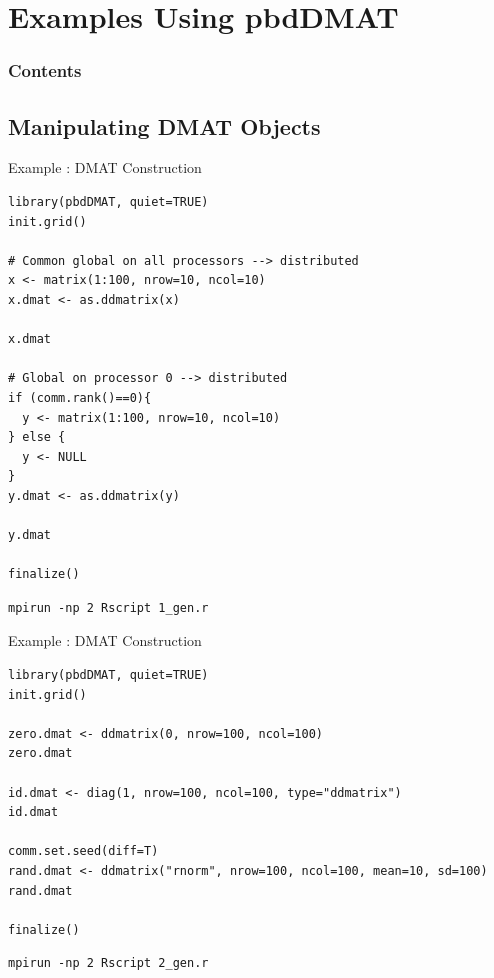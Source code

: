 \section[pbdDMAT eg's]{Examples Using pbdDMAT}
\setcounter{excount}{0}


\hidenum
\begin{frame}[noframenumbering]
\frametitle{Contents}
 \tableofcontents[currentsection,hideothersubsections,sectionstyle=show/hide]
\end{frame}
\shownum



\subsection{Manipulating DMAT Objects}

\begin{frame}
  \begin{exampleblock}{Example \countex:  DMAT Construction}\pause
\begin{lstlisting}[title=Generate a global matrix and distribute it]
library(pbdDMAT, quiet=TRUE)
init.grid()

# Common global on all processors --> distributed
x <- matrix(1:100, nrow=10, ncol=10)
x.dmat <- as.ddmatrix(x)

x.dmat

# Global on processor 0 --> distributed
if (comm.rank()==0){
  y <- matrix(1:100, nrow=10, ncol=10)
} else {
  y <- NULL
}
y.dmat <- as.ddmatrix(y)

y.dmat

finalize()
\end{lstlisting}
\begin{lstlisting}[basicstyle=\tiny,backgroundcolor=\color{white},keywordstyle=\color{black},title=\fontsize{6pt}{7.2}\selectfont Execute this script via:]
mpirun -np 2 Rscript 1_gen.r
\end{lstlisting} 
  \end{exampleblock}
\end{frame}



\begin{frame}[fragile]
  \begin{exampleblock}{Example \countex:  DMAT Construction}\pause
\begin{lstlisting}[title=Generate locally only what is needed]
library(pbdDMAT, quiet=TRUE)
init.grid()

zero.dmat <- ddmatrix(0, nrow=100, ncol=100)
zero.dmat

id.dmat <- diag(1, nrow=100, ncol=100, type="ddmatrix")
id.dmat

comm.set.seed(diff=T)
rand.dmat <- ddmatrix("rnorm", nrow=100, ncol=100, mean=10, sd=100)
rand.dmat

finalize()
\end{lstlisting}
\begin{lstlisting}[basicstyle=\tiny,backgroundcolor=\color{white},keywordstyle=\color{black},title=\fontsize{6pt}{7.2}\selectfont Execute this script via:]
mpirun -np 2 Rscript 2_gen.r
\end{lstlisting} 
  \end{exampleblock}
\end{frame}



